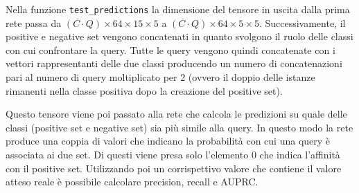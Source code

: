 \documentclass[12pt,a4paper,titlepage]{article}
\begin{document}
Nella funzione \texttt{test\_predictions} la dimensione del tensore in uscita dalla prima rete passa da $(C \cdot Q) \times 64 \times 15 \times 5$ a $(C \cdot Q) \times 64 \times 5 \times 5$. Successivamente, il positive e negative set vengono concatenati in quanto svolgono il ruolo delle classi con cui confrontare la query.
Tutte le query vengono quindi concatenate con i vettori rappresentanti delle due classi producendo un numero di concatenazioni pari al numero di query moltiplicato per 2 (ovvero il doppio delle istanze rimanenti nella classe positiva dopo la creazione del positive set).

Questo tensore viene poi passato alla rete che calcola le predizioni su quale delle classi (positive set e negative set) sia più simile alla query. In questo modo la rete produce una coppia di valori che indicano la probabilità con cui una query è associata ai due set.
Di questi viene presa solo l'elemento 0 che indica l'affinità con il positive set.
Utilizzando poi un corrispettivo valore che contiene il valore atteso reale è possibile calcolare precision, recall e AUPRC.
\end{document}

